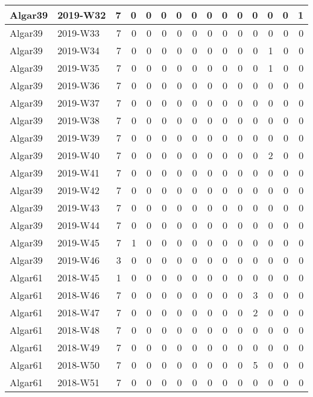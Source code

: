 \documentclass[]{book}
\begin{document}
\begin{table}
\begin{tabular}[t]{l|l|r|r|r|r|r|r|r|r|r|r|r|r|r}
\hline
Algar39 & 2019-W32 & 7 & 0 & 0 & 0 & 0 & 0 & 0 & 0 & 0 & 0 & 0 & 0 & 1\\
\hline
Algar39 & 2019-W33 & 7 & 0 & 0 & 0 & 0 & 0 & 0 & 0 & 0 & 0 & 0 & 0 & 0\\
\hline
Algar39 & 2019-W34 & 7 & 0 & 0 & 0 & 0 & 0 & 0 & 0 & 0 & 0 & 1 & 0 & 0\\
\hline
Algar39 & 2019-W35 & 7 & 0 & 0 & 0 & 0 & 0 & 0 & 0 & 0 & 0 & 1 & 0 & 0\\
\hline
Algar39 & 2019-W36 & 7 & 0 & 0 & 0 & 0 & 0 & 0 & 0 & 0 & 0 & 0 & 0 & 0\\
\hline
Algar39 & 2019-W37 & 7 & 0 & 0 & 0 & 0 & 0 & 0 & 0 & 0 & 0 & 0 & 0 & 0\\
\hline
Algar39 & 2019-W38 & 7 & 0 & 0 & 0 & 0 & 0 & 0 & 0 & 0 & 0 & 0 & 0 & 0\\
\hline
Algar39 & 2019-W39 & 7 & 0 & 0 & 0 & 0 & 0 & 0 & 0 & 0 & 0 & 0 & 0 & 0\\
\hline
Algar39 & 2019-W40 & 7 & 0 & 0 & 0 & 0 & 0 & 0 & 0 & 0 & 0 & 2 & 0 & 0\\
\hline
Algar39 & 2019-W41 & 7 & 0 & 0 & 0 & 0 & 0 & 0 & 0 & 0 & 0 & 0 & 0 & 0\\
\hline
Algar39 & 2019-W42 & 7 & 0 & 0 & 0 & 0 & 0 & 0 & 0 & 0 & 0 & 0 & 0 & 0\\
\hline
Algar39 & 2019-W43 & 7 & 0 & 0 & 0 & 0 & 0 & 0 & 0 & 0 & 0 & 0 & 0 & 0\\
\hline
Algar39 & 2019-W44 & 7 & 0 & 0 & 0 & 0 & 0 & 0 & 0 & 0 & 0 & 0 & 0 & 0\\
\hline
Algar39 & 2019-W45 & 7 & 1 & 0 & 0 & 0 & 0 & 0 & 0 & 0 & 0 & 0 & 0 & 0\\
\hline
Algar39 & 2019-W46 & 3 & 0 & 0 & 0 & 0 & 0 & 0 & 0 & 0 & 0 & 0 & 0 & 0\\
\hline
Algar61 & 2018-W45 & 1 & 0 & 0 & 0 & 0 & 0 & 0 & 0 & 0 & 0 & 0 & 0 & 0\\
\hline
Algar61 & 2018-W46 & 7 & 0 & 0 & 0 & 0 & 0 & 0 & 0 & 0 & 3 & 0 & 0 & 0\\
\hline
Algar61 & 2018-W47 & 7 & 0 & 0 & 0 & 0 & 0 & 0 & 0 & 0 & 2 & 0 & 0 & 0\\
\hline
Algar61 & 2018-W48 & 7 & 0 & 0 & 0 & 0 & 0 & 0 & 0 & 0 & 0 & 0 & 0 & 0\\
\hline
Algar61 & 2018-W49 & 7 & 0 & 0 & 0 & 0 & 0 & 0 & 0 & 0 & 0 & 0 & 0 & 0\\
\hline
Algar61 & 2018-W50 & 7 & 0 & 0 & 0 & 0 & 0 & 0 & 0 & 0 & 5 & 0 & 0 & 0\\
\hline
Algar61 & 2018-W51 & 7 & 0 & 0 & 0 & 0 & 0 & 0 & 0 & 0 & 0 & 0 & 0 & 0\\

\end{tabular}
\end{table}
\end{document}
